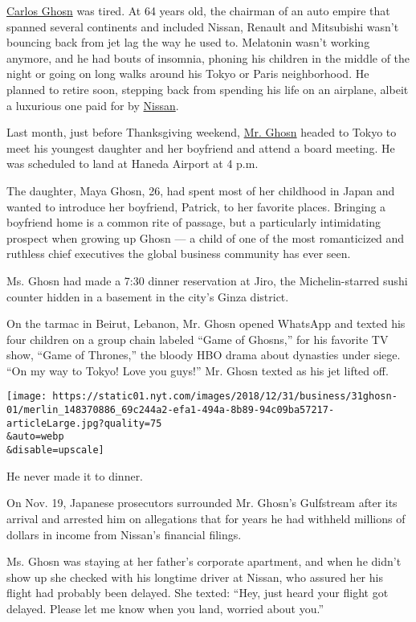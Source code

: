 \href{https://www.nytimes.com/2020/01/02/business/carlos-ghosn-france-extradite.html}{Carlos
Ghosn} was tired. At 64 years old, the chairman of an auto empire that
spanned several continents and included Nissan, Renault and Mitsubishi
wasn't bouncing back from jet lag the way he used to. Melatonin wasn't
working anymore, and he had bouts of insomnia, phoning his children in
the middle of the night or going on long walks around his Tokyo or Paris
neighborhood. He planned to retire soon, stepping back from spending his
life on an airplane, albeit a luxurious one paid for by
\href{https://www.nytimes.com/2020/01/02/business/carlos-ghosn-france-extradite.html}{Nissan}.

Last month, just before Thanksgiving weekend,
\href{https://www.nytimes.com/2020/01/02/business/carlos-ghosn-france-extradite.html}{Mr.
Ghosn} headed to Tokyo to meet his youngest daughter and her boyfriend
and attend a board meeting. He was scheduled to land at Haneda Airport
at 4 p.m.

The daughter, Maya Ghosn, 26, had spent most of her childhood in Japan
and wanted to introduce her boyfriend, Patrick, to her favorite places.
Bringing a boyfriend home is a common rite of passage, but a
particularly intimidating prospect when growing up Ghosn --- a child of
one of the most romanticized and ruthless chief executives the global
business community has ever seen.

Ms. Ghosn had made a 7:30 dinner reservation at Jiro, the
Michelin-starred sushi counter hidden in a basement in the city's Ginza
district.

On the tarmac in Beirut, Lebanon, Mr. Ghosn opened WhatsApp and texted
his four children on a group chain labeled ``Game of Ghosns,'' for his
favorite TV show, ``Game of Thrones,'' the bloody HBO drama about
dynasties under siege. ``On my way to Tokyo! Love you guys!'' Mr. Ghosn
texted as his jet lifted off.

\texttt{[image: https://static01.nyt.com/images/2018/12/31/business/31ghosn-01/merlin\_148370886\_69c244a2-efa1-494a-8b89-94c09ba57217-articleLarge.jpg?quality=75\\\&auto=webp\\\&disable=upscale]}

He never made it to dinner.

On Nov. 19, Japanese prosecutors surrounded Mr. Ghosn's Gulfstream after
its arrival and arrested him on allegations that for years he had
withheld millions of dollars in income from Nissan's financial filings.

Ms. Ghosn was staying at her father's corporate apartment, and when he
didn't show up she checked with his longtime driver at Nissan, who
assured her his flight had probably been delayed. She texted: ``Hey,
just heard your flight got delayed. Please let me know when you land,
worried about you.''

